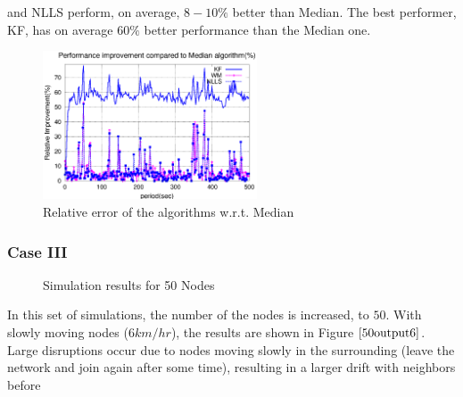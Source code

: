\documentclass[journal]{IEEEtran}
\begin{document}
and NLLS perform, on average, $8-10\%$ better than Median. The best
performer, KF, has on average $60\%$ better performance than the
Median one.
\begin{figure}
\centering \includegraphics[width=2.5in]{16output-error}
\caption{Relative error of the algorithms w.r.t. Median}
\label{16relerror}
\end{figure}
\subsubsection{\textbf{Case III}}
\begin{figure}
\centerline{  \hfil {}} \caption{Simulation results for 50 Nodes}
\label{50output}
\end{figure}
In this set of simulations, the number of the nodes is increased, to
$50$. With slowly moving nodes ($6km/hr$), the results are shown in
Figure $\ref{50output6}$. Large disruptions occur due to nodes
moving slowly in the surrounding (leave the network and join again
after some time), resulting in a larger drift with neighbors before
\end{document}
